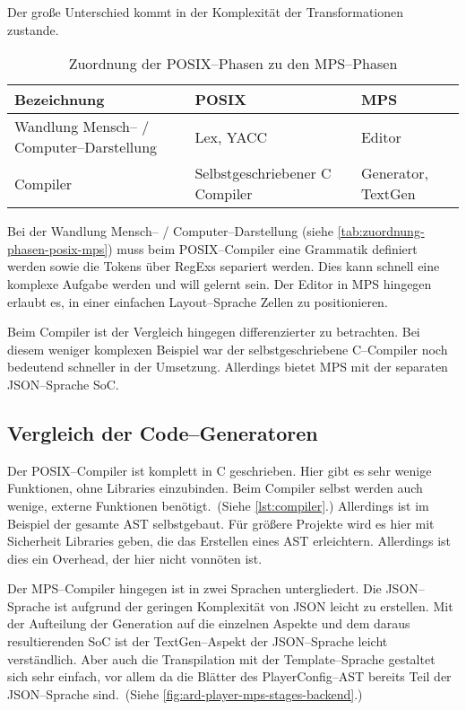 Der große Unterschied kommt in der Komplexität der Transformationen zustande.
\begin{table}[ht]
    \centering
    \begin{tabular}{|p{}|p{}|p{}|}
        \hline
        Bezeichnung                               & \ac{POSIX}                     & \ac{MPS}           \\
        \hline
        \hline
        Wandlung Mensch-- / Computer--Darstellung & Lex, \ac{YACC}                 & Editor             \\
        \hline
        Compiler                                  & Selbstgeschriebener C Compiler & Generator, TextGen \\
        \hline
    \end{tabular}
    \caption{Zuordnung der \acs{POSIX}--Phasen zu den \acs{MPS}--Phasen}
    \label{tab:zuordnung-phasen-posix-mps}
\end{table}
Bei der Wandlung Mensch-- / Computer--Darstellung (siehe \autoref{tab:zuordnung-phasen-posix-mps}) muss beim \acs{POSIX}--Compiler eine Grammatik definiert werden sowie die Tokens über \acp{RegEx} separiert werden.
Dies kann schnell eine komplexe Aufgabe werden und will gelernt sein.
Der Editor in \ac{MPS} hingegen erlaubt es, in einer einfachen Layout--Sprache Zellen zu positionieren.

Beim Compiler ist der Vergleich hingegen differenzierter zu betrachten.
Bei diesem weniger komplexen Beispiel war der selbstgeschriebene C--Compiler noch bedeutend schneller in der Umsetzung.
Allerdings bietet \ac{MPS} mit der separaten \acs{JSON}--Sprache \ac{SoC}.

\subsection{Vergleich der Code--Generatoren}\label{subsec:vergleich-der-code--generatoren}
Der \acs{POSIX}--Compiler ist komplett in C geschrieben.
Hier gibt es sehr wenige Funktionen, ohne Libraries einzubinden.
Beim Compiler selbst werden auch wenige, externe Funktionen benötigt.\ (Siehe \autoref{lst:compiler}.)
Allerdings ist im Beispiel der gesamte \ac{AST} selbstgebaut.
Für größere Projekte wird es hier mit Sicherheit Libraries geben, die das Erstellen eines \ac{AST} erleichtern. %
Allerdings ist dies ein Overhead, der hier nicht vonnöten ist.

Der \acs{MPS}--Compiler hingegen ist in zwei Sprachen untergliedert.
Die \acs{JSON}--Sprache ist aufgrund der geringen Komplexität von \ac{JSON} leicht zu erstellen.
Mit der Aufteilung der Generation auf die einzelnen Aspekte und dem daraus resultierenden \ac{SoC} ist der TextGen--Aspekt der \ac{JSON}--Sprache leicht verständlich.
Aber auch die Transpilation mit der Template--Sprache gestaltet sich sehr einfach, vor allem da die Blätter des {\ttfamily PlayerConfig}--\acs{AST} bereits Teil der \ac{JSON}--Sprache sind.\ (Siehe \autoref{fig:ard-player-mps-stages-backend}.)

